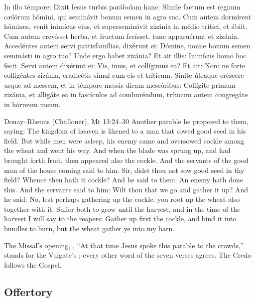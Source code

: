 \begin{latinproper}
In illo témpore: Dixit Iesus turbis parábolam hanc: Símile factum est regnum
cælórum hómini, qui seminávit bonum semen in agro suo. Cum autem dormírent
hómines, venit inimícus eius, et superseminávit zizánia in médio trítici, et
ábiit. Cum autem crevísset herba, et fructum fecísset, tunc apparuérunt et
zizánia. Accedéntes autem servi patrisfamílias, dixérunt ei: Dómine, nonne
bonum semen seminásti in agro tuo? Unde ergo habet zizánia? Et ait illis:
Inimícus homo hoc fecit. Servi autem dixérunt ei: Vis, imus, et collígimus
ea? Et ait: Non: ne forte colligéntes zizánia, eradicétis simul cum eis et
tríticum. Sínite útraque créscere usque ad messem, et in témpore messis dicam
messóribus: Collígite primum zizánia, et alligáte ea in fascículos ad
comburéndum, tríticum autem congregáte in hórreum meum.
\end{latinproper}

\begin{englishwitness}{Douay--Rheims (Challoner), Mt 13:24--30}
Another parable he proposed to them, saying: The kingdom of heaven is likened
to a man that sowed good seed in his field. But while men were asleep, his
enemy came and oversowed cockle among the wheat and went his way. And when the
blade was sprung up, and had brought forth fruit, then appeared also the
cockle. And the servants of the good man of the house coming said to him. Sir,
didst thou not sow good seed in thy field? Whence then hath it cockle? And he
said to them: An enemy hath done this. And the servants said to him: Wilt
thou that we go and gather it up? And he said: No, lest perhaps gathering up
the cockle, you root up the wheat also together with it. Suffer both to grow
until the harvest, and in the time of the harvest I will say to the reapers:
Gather up first the cockle, and bind it into bundles to burn, but the wheat
gather ye into my barn.
\end{englishwitness}

\noindent The Missal's opening, , ``At that time Jesus spoke this parable to the crowds,''
stands for the Vulgate's ; every
other word of the seven verses agrees. The Credo follows the Gospel.

\subsection{Offertory}
\label{proper-offertory}

